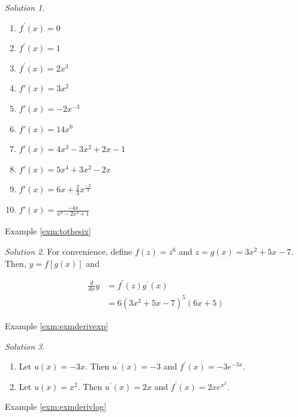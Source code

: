 \documentclass[
]{book}
\providecommand{\tightlist}{%
  \setlength{\itemsep}{0pt}\setlength{\parskip}{0pt}}
\theoremstyle{definition}
\theoremstyle{definition}
\theoremstyle{definition}
\theoremstyle{remark}
\newtheorem*{solution}{Solution}
\begin{document}
\begin{solution}
{}

\begin{enumerate}
\def\labelenumi{\arabic{enumi}.}
\tightlist
\item
  \(f^\prime(x)= 0\)
\item
  \(f^\prime(x)= 1\)
\item
  \(f^\prime(x)= 2x^3\)
\item
  \(f\prime(x)= 3x^2\)
\item
  \(f\prime(x)= -2x^{-3}\)
\item
  \(f\prime(x)= 14x^6\)
\item
  \(f\prime(x) = 4x^3 - 3x^2 + 2x -1\)
\item
  \(f\prime(x) = 5x^4 + 3x^2 - 2x\)
\item
  \(f\prime(x) = 6x + \frac{2}{3}x^{\frac{-2}{3}}\)
\item
  \(f\prime(x)= \frac{-4x}{x^4 - 2x^2 + 1}\)
\end{enumerate}
\end{solution}

Example \ref{exm:tothesix}

\begin{solution}
{}For convenience, define \(f(z) = z^6\) and \(z = g(x) = 3x^2+5x-7\). Then, \(y=f[g(x)]\) and

\begin{align*}
\frac{d}{dx}y&= f^\prime(z) g^\prime(x) \\
&= 6(3x^2+5x-7)^5 (6x + 5)
\end{align*}
\end{solution}

Example \ref{exm:exmderivexp}

\begin{solution}
{}

\begin{enumerate}
\def\labelenumi{\arabic{enumi}.}
\tightlist
\item
  Let \(u(x)=-3x\). Then \(u^\prime(x)=-3\) and \(f^\prime(x)=-3e^{-3x}\).
\item
  Let \(u(x)=x^2\). Then \(u^\prime(x)=2x\) and \(f^\prime(x)=2xe^{x^2}\).
\end{enumerate}
\end{solution}

Example \ref{exm:exmderivlog}
\end{document}
